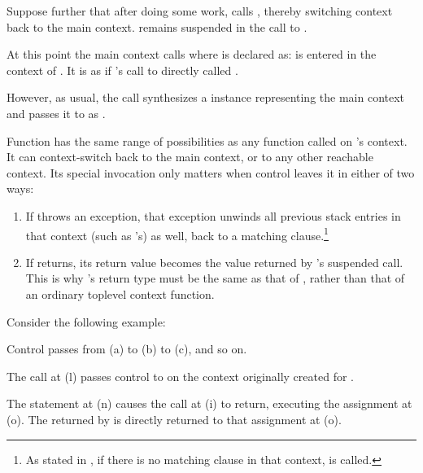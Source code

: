 Suppose further that after doing some work,  calls ,
thereby switching context back to the main context.  remains
suspended in the call to .

At this point the main context calls 
where  is declared as:
\newline
\ectxvoid{}\ectxvoid{}
\newline
{} is entered in the context of . It is as if 's call
to  directly called .

However, as usual, the  call synthesizes a \ectx
instance representing the main context and passes it to 
as .

Function  has the same range of possibilities as any function called
on 's context. It can context-switch back to the main context, or to
any other reachable context. Its special invocation only matters when control
leaves it in either of two ways:

\begin{enumerate}
  \item If  throws an exception, that exception unwinds all previous
  stack entries in that context (such as 's) as well, back to a
  matching  clause.\footnote{As stated
  in , if there is no matching  clause
  in that context,  is called.}
  \item If  returns, its return value becomes the value returned
  by 's suspended  call. This is
  why 's return type must be the same as that of \op, rather than
  that of an ordinary toplevel context function.
\end{enumerate}

Consider the following example:


Control passes from (a) to (b) to (c), and so on.

The  call at (l) passes control
to  on the context originally created for .

The  statement at (n) causes the \op call at (i) to return,
executing the assignment at (o). The  returned by 
is directly returned to that assignment at (o).

